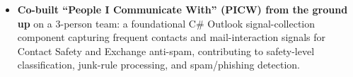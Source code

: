 \documentclass{resume}
\begin{document}
\begin{itemize}
  \item \textbf{Co-built ``People I Communicate With'' (PICW) from the ground up} on a 3-person team: a foundational C\# Outlook signal-collection component capturing frequent contacts and mail-interaction signals for Contact Safety and Exchange anti-spam, contributing to safety-level classification, junk-rule processing, and spam/phishing detection.

\end{itemize}
\end{document}
